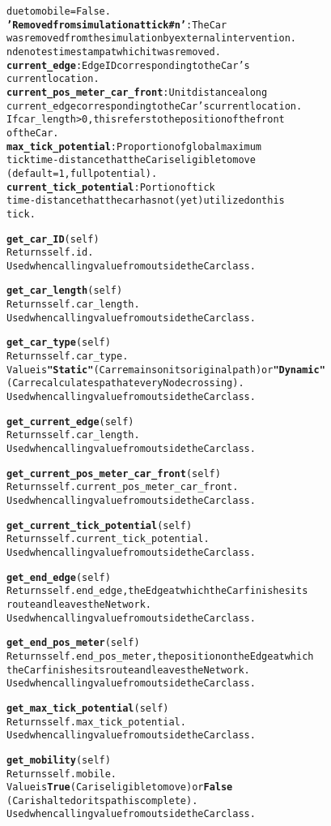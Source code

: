 \begin{alltt}
        due to mobile=False.
        \textbf{'Removed from simulation at tick #n'}:  The Car 
        was removed from the simulation by external intervention.  
        n denotes timestamp at which it was removed.
    \textbf{current_edge}:  Edge ID corresponding to the Car's 
    current location.
    \textbf{current_pos_meter_car_front}:  Unit distance along
    current_edge corresponding to the Car's current location.  
    If car_length > 0, this refers to the position of the front 
    of the Car.
    \textbf{max_tick_potential}:  Proportion of global maximum 
    tick time-distance that the Car is eligible to move 
    (default = 1, full potential).
    \textbf{current_tick_potential}:  Portion of tick 
    time-distance that the car has not (yet) utilized on this 
    tick.

\textbf{get_car_ID}(self)
Returns self.id.
Used when calling value from outside the Car class.

\textbf{get_car_length}(self)
Returns self.car_length.
Used when calling value from outside the Car class.

\textbf{get_car_type}(self)
Returns self.car_type.
Value is \textbf{"Static"} (Car remains on its original path) or \textbf{"Dynamic"}
(Car recalculates path at every Node crossing).
Used when calling value from outside the Car class.

\textbf{get_current_edge}(self)
Returns self.car_length.
Used when calling value from outside the Car class.

\textbf{get_current_pos_meter_car_front}(self)
Returns self.current_pos_meter_car_front.
Used when calling value from outside the Car class.

\textbf{get_current_tick_potential}(self)
Returns self.current_tick_potential.
Used when calling value from outside the Car class.

\textbf{get_end_edge}(self)
Returns self.end_edge, the Edge at which the Car finishes its 
route and leaves the Network.
Used when calling value from outside the Car class.

\textbf{get_end_pos_meter}(self)
Returns self.end_pos_meter, the position on the Edge at which 
the Car finishes its route and leaves the Network.
Used when calling value from outside the Car class.

\textbf{get_max_tick_potential}(self)
Returns self.max_tick_potential.
Used when calling value from outside the Car class.

\textbf{get_mobility}(self)
Returns self.mobile.
Value is \textbf{True} (Car is eligible to move) or \textbf{False} 
(Car is halted or its path is complete).
Used when calling value from outside the Car class.


\end{alltt}
